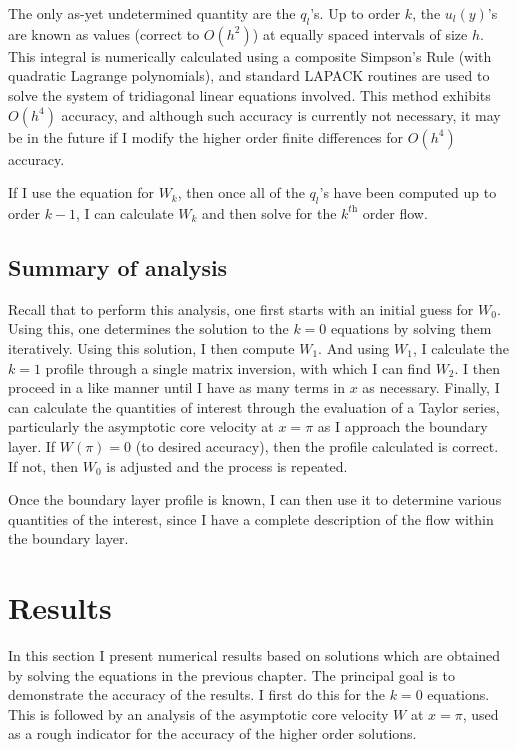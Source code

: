 \documentclass[10pt,a4paper]{report}
\begin{document}
The only as-yet undetermined quantity are the $q_l$'s. Up to order $k$, the $u_l(y)$'s are known as values (correct to $O(h^2)$) at equally spaced intervals of size $h$. This integral is numerically calculated using a composite Simpson's Rule (with quadratic Lagrange polynomials), and standard LAPACK routines are used to solve the system of tridiagonal linear equations involved. This method exhibits $O(h^4)$ accuracy, and although such accuracy is currently not necessary, it may be in the future if I modify the higher order finite differences for $O(h^4)$ accuracy.

If I use the equation for $W_k$, then once all of the $q_l$'s have been computed up to order $k-1$, I can calculate $W_k$ and then solve for the $k^\textit{th}$ order flow.

\section{Summary of analysis}

Recall that to perform this analysis, one first starts with an initial guess for $W_0$. Using this, one determines the solution to the $k = 0$ equations by solving them iteratively. Using this solution, I then compute $W_1$. And using $W_1$, I calculate the $k = 1$ profile through a single matrix inversion, with which I can find $W_2$. I then proceed in a like manner until I have as many terms in $x$ as necessary. Finally, I can calculate the quantities of interest through the evaluation of a Taylor series, particularly the asymptotic core velocity at $x = \pi$ as I approach the boundary layer. If $W(\pi) = 0$ (to desired accuracy), then the profile calculated is correct. If not, then $W_0$ is adjusted and the process is repeated.

Once the boundary layer profile is known, I can then use it to determine various quantities of the interest, since I have a complete description of the flow within the boundary layer.

\chapter{Results}
In this section I present numerical results based on solutions which are obtained by solving the equations in the previous chapter. The principal goal is to demonstrate the accuracy of the results. I first do this for the $k=0$ equations. This is followed by an analysis of the asymptotic core velocity $W$ at $x=\pi$, used as a rough indicator for the accuracy of the higher order solutions.
\end{document}
